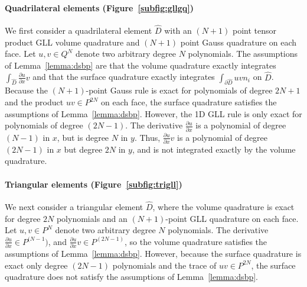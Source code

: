\documentclass[review]{siamart0216}
\theoremstyle{assumption}
\renewcommand{\hat}[1]{\hat{#1}}
\newcommand{\pd}[2]{\frac{\partial#1}{\partial#2}}
\renewcommand{\hat}{\widehat}
\begin{document}
\paragraph{Quadrilateral elements (Figure~\ref{subfig:gllgq})} We first consider a quadrilateral element $\hat{D}$ with an $(N+1)$ point tensor product GLL volume quadrature and $(N+1)$ point Gauss quadrature on each face.  Let $u,v \in Q^N$ denote two arbitrary degree $N$ polynomials.  The assumptions of Lemma~\ref{lemma:dsbp} are that the volume quadrature exactly integrates $\int_{\hat{D}} \pd{u}{x} v$ and that the surface quadrature exactly integrates $\int_{\partial \hat{D}} u v n_i$ on $\hat{D}$.  Because the $(N+1)$-point Gauss rule is exact for polynomials of degree $2N+1$ and the product $uv \in P^{2N}$ on each face, the surface quadrature satisfies the assumptions of Lemma~\ref{lemma:dsbp}.  However, the 1D GLL rule is only exact for polynomials of degree $(2N-1)$.  The derivative $\pd{u}{x}$ is a polynomial of degree $(N-1)$ in $x$, but is degree $N$ in $y$.  Thus, $\pd{u}{x}v$ is a polynomial of degree $(2N-1)$ in $x$ but degree $2N$ in $y$, and is not integrated exactly by the volume quadrature.  

\paragraph{Triangular elements (Figure~\ref{subfig:trigll})} We next consider a triangular element $\hat{D}$, where the volume quadrature is exact for degree $2N$ polynomials \cite{xiao2010quadrature} and an $(N+1)$-point GLL quadrature on each face.  Let $u,v \in P^N$ denote two arbitrary degree $N$ polynomials.  The derivative $\pd{u}{x} \in P^{(N-1})$, and $\pd{u}{x}v \in P^{(2N-1)}$, so the volume quadrature satisfies the assumptions of Lemma~\ref{lemma:dsbp}.  However, because the surface quadrature is exact only degree $(2N-1)$ polynomials and the trace of $uv\in P^{2N}$, the surface quadrature does not satisfy the assumptions of Lemma~\ref{lemma:dsbp}.
\end{document}
